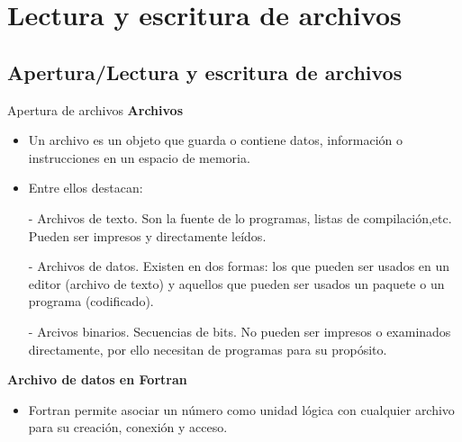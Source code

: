 
\section{Lectura y escritura de archivos}  


\subsection{Apertura/Lectura y escritura de archivos}

\begin{frame}[fragile]{Apertura de archivos} 
\textbf{Archivos}    
      \begin{itemize}[<+(1)->]
        \item Un archivo es un objeto que guarda o contiene datos, información o instrucciones en un espacio de memoria.
        \item Entre ellos destacan:
        \item [-] Archivos de texto. Son la fuente de lo programas, listas de compilación,etc. Pueden ser impresos y directamente leídos.
        \item [-] Archivos de datos. Existen en dos formas: los que pueden ser usados en un editor (archivo de texto) y aquellos que pueden ser usados un paquete o un programa (codificado).
        \item [-] Arcivos binarios. Secuencias de bits. No pueden ser impresos o examinados directamente, por ello necesitan de programas para su propósito.
      \end{itemize}
\textbf{Archivo de datos en Fortran}
      \begin{itemize}[<+(1)->]
        \item Fortran permite asociar un número como unidad lógica con cualquier archivo para su creación, conexión y acceso.
      \end{itemize}  
\end{frame}

